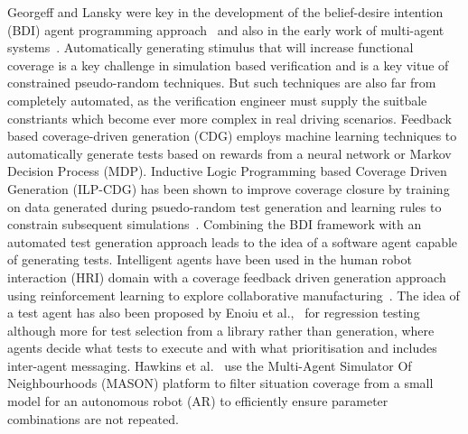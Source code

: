 \documentclass[letterpaper, 10 pt, journal, twoside]{IEEEtran}
\begin{document}
Georgeff and Lansky were key in the development of the belief-desire intention (BDI) agent programming approach~\cite{georgeff1987reactive} and also in the early work of multi-agent systems~\cite{georgeff1988communication}.
%
%
%
Automatically generating stimulus that will increase functional coverage is a key challenge in simulation based verification and is a key vitue of constrained pseudo-random techniques. But such techniques are also far from completely automated, as the verification engineer must supply the suitbale constriants which become ever more complex in real driving scenarios. Feedback based coverage-driven generation (CDG) employs machine learning techniques to automatically generate tests based on rewards from a neural network or Markov Decision Process (MDP). Inductive Logic Programming based Coverage Driven Generation (ILP-CDG) has been shown to improve coverage closure by training on data generated during psuedo-random test generation and learning rules to constrain subsequent simulations~\cite{Eder2007}.
%
Combining the BDI framework with an automated test generation approach leads to the idea of a software agent capable of generating tests. Intelligent agents have been used in the human robot interaction (HRI) domain with a coverage feedback driven generation approach using reinforcement learning to explore collaborative manufacturing~\cite{Araiza-Illan2016}. The idea of a test agent has also been proposed by Enoiu et al.,~\cite{Enoiu2019} for regression testing although more for test selection from a library rather than generation, where agents decide what tests to execute and with what prioritisation and includes inter-agent messaging.
%
Hawkins et al.~\cite{hawkins2019situation} use the Multi-Agent Simulator Of Neighbourhoods (MASON) platform to filter situation coverage from a small model for an autonomous robot (AR) to efficiently ensure parameter combinations are not repeated.
\end{document}
